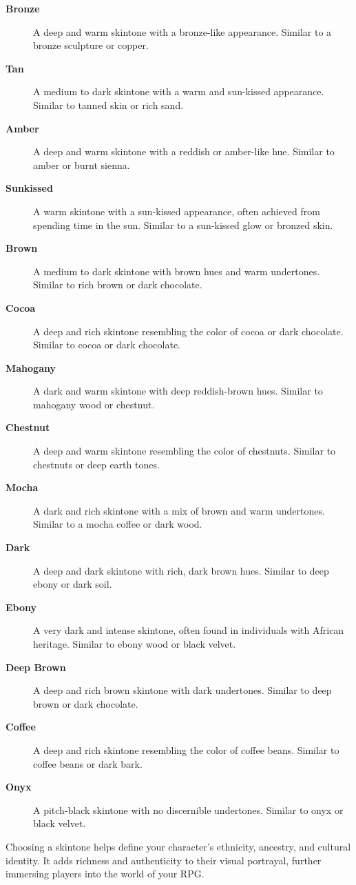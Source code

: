 \documentclass[12pt]{book}
\begin{document}
\begin{description}
    \item[\textbf{Bronze}] A deep and warm skintone with a bronze-like appearance. Similar to a bronze sculpture or copper.
    \item[\textbf{Tan}] A medium to dark skintone with a warm and sun-kissed appearance. Similar to tanned skin or rich sand.
    \item[\textbf{Amber}] A deep and warm skintone with a reddish or amber-like hue. Similar to amber or burnt sienna.
    \item[\textbf{Sunkissed}] A warm skintone with a sun-kissed appearance, often achieved from spending time in the sun. Similar to a sun-kissed glow or bronzed skin.
    \item[\textbf{Brown}] A medium to dark skintone with brown hues and warm undertones. Similar to rich brown or dark chocolate.
    \item[\textbf{Cocoa}] A deep and rich skintone resembling the color of cocoa or dark chocolate. Similar to cocoa or dark chocolate.
    \item[\textbf{Mahogany}] A dark and warm skintone with deep reddish-brown hues. Similar to mahogany wood or chestnut.
    \item[\textbf{Chestnut}] A deep and warm skintone resembling the color of chestnuts. Similar to chestnuts or deep earth tones.
    \item[\textbf{Mocha}] A dark and rich skintone with a mix of brown and warm undertones. Similar to a mocha coffee or dark wood.
    \item[\textbf{Dark}] A deep and dark skintone with rich, dark brown hues. Similar to deep ebony or dark soil.
    \item[\textbf{Ebony}] A very dark and intense skintone, often found in individuals with African heritage. Similar to ebony wood or black velvet.
    \item[\textbf{Deep Brown}] A deep and rich brown skintone with dark undertones. Similar to deep brown or dark chocolate.
    \item[\textbf{Coffee}] A deep and rich skintone resembling the color of coffee beans. Similar to coffee beans or dark bark.
    \item[\textbf{Onyx}] A pitch-black skintone with no discernible undertones. Similar to onyx or black velvet.
\end{description}

Choosing a skintone helps define your character's ethnicity, ancestry, and cultural identity. It adds richness and authenticity to their visual portrayal, further immersing players into the world of your RPG.
\end{document}
